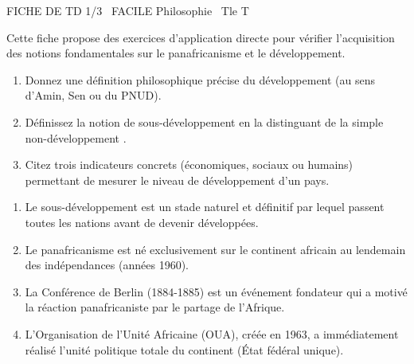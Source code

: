 \documentclass[11pt]{article}
\begin{document}
\begin{tcolorbox}[enhanced,colback=popink,colframe=popink,arc=10pt,boxrule=0pt,left=12pt,right=12pt,top=9pt,bottom=9pt]
{\color{white}\popxbold\small FICHE DE TD 1/3 \textbullet\ FACILE \hfill Philosophie \textbullet\ Tle T\par}
\end{tcolorbox}
\vspace{4pt}
Cette fiche propose des exercices d'application directe pour vérifier l'acquisition des notions fondamentales sur le panafricanisme et le développement.

\begin{exercice}
\begin{enumerate}
    \item Donnez une définition philosophique précise du \og développement \fg (au sens d'Amin, Sen ou du PNUD).
    \item Définissez la notion de \og sous-développement \fg en la distinguant de la simple \og non-développement \fg.
    \item Citez trois indicateurs concrets (économiques, sociaux ou humains) permettant de mesurer le niveau de développement d'un pays.
\end{enumerate}
\end{exercice}

\begin{exercice}
\begin{enumerate}
    \item Le sous-développement est un stade naturel et définitif par lequel passent toutes les nations avant de devenir développées.
    \item Le panafricanisme est né exclusivement sur le continent africain au lendemain des indépendances (années 1960).
    \item La Conférence de Berlin (1884-1885) est un événement fondateur qui a motivé la réaction panafricaniste par le partage de l'Afrique.
    \item L'Organisation de l'Unité Africaine (OUA), créée en 1963, a immédiatement réalisé l'unité politique totale du continent (État fédéral unique).
\end{enumerate}
\end{exercice}
\end{document}
